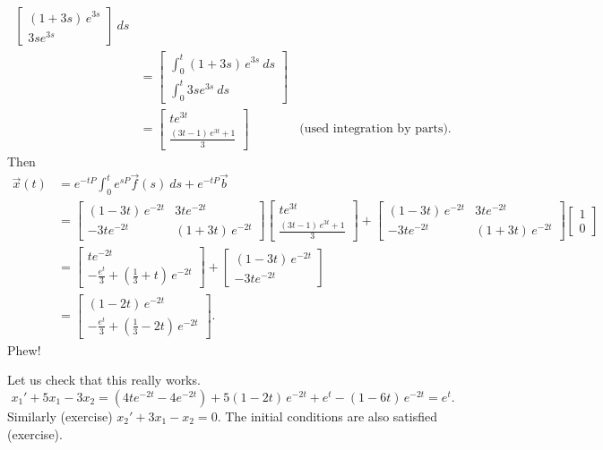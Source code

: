 \documentclass[12pt]{book}
\begin{document}
\begin{example}
\begin{equation*}
\begin{split}
\begin{bmatrix}
 (1+3s)\,e^{3s} \\
 3se^{3s}
 \end{bmatrix}
~ ds
\\
 &=
 \begin{bmatrix}
 \int_0^t (1+3s)\,e^{3s} ~ds \\
 \int_0^t 3se^{3s} ~ds
 \end{bmatrix}
\\
& =
\begin{bmatrix}
t e^{3t} \\
\frac{(3t-1) \,e^{3t} + 1}{3}
\end{bmatrix} %
\qquad \qquad \text{(used integration by parts).}
\end{split}
\end{equation*}
Then
\begin{equation*}
\begin{split}
\vec{x}(t)
& = e^{-tP} \int_0^t e^{sP}\vec{f}(s) ~ ds + e^{-tP} \vec{b} \\
& =
\begin{bmatrix}
(1-3t)\,e^{-2t} & 3te^{-2t} \\
-3te^{-2t} & (1+3t)\,e^{-2t}
\end{bmatrix}
\begin{bmatrix}
t e^{3t} \\
\frac{(3t-1) \,e^{3t} + 1}{3}
\end{bmatrix}
+
\begin{bmatrix}
(1-3t)\,e^{-2t} & 3te^{-2t} \\
-3te^{-2t} & (1+3t)\,e^{-2t}
\end{bmatrix}
\begin{bmatrix} 1 \\ 0 \end{bmatrix} \\
& =
\begin{bmatrix}
te^{-2t} \\
-\frac{e^t}{3}+\left( \frac{1}{3} + t \right) \, e^{-2t}
\end{bmatrix}
+
\begin{bmatrix}
(1-3t)\,e^{-2t} \\
-3te^{-2t}
\end{bmatrix} \\
& =
\begin{bmatrix}
(1-2t)\,e^{-2t} \\
-\frac{e^t}{3}+\left( \frac{1}{3} -2 t \right) \, e^{-2t}
\end{bmatrix} .
\end{split}
\end{equation*}
Phew!

Let us check that this really works.
\begin{equation*}
x_1' + 5 x_1 - 3x_2 = (4te^{-2t} - 4 e^{-2t}) + 5
(1-2t)\,e^{-2t} 
+e^t-( 1 -6 t ) \, e^{-2t} = e^t .
\end{equation*}
Similarly (exercise) $x_2' + 3 x_1 - x_2 = 0$.   The initial conditions are
also satisfied (exercise).
\end{example}
\end{document}
